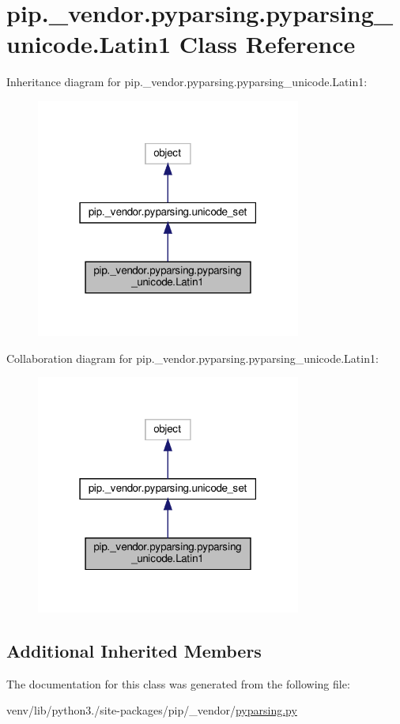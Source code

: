 \hypertarget{classpip_1_1__vendor_1_1pyparsing_1_1pyparsing__unicode_1_1Latin1}{}\section{pip.\+\_\+vendor.\+pyparsing.\+pyparsing\+\_\+unicode.\+Latin1 Class Reference}
\label{classpip_1_1__vendor_1_1pyparsing_1_1pyparsing__unicode_1_1Latin1}


Inheritance diagram for pip.\+\_\+vendor.\+pyparsing.\+pyparsing\+\_\+unicode.\+Latin1\+:
\nopagebreak
\begin{figure}[H]
\begin{center}
\leavevmode
\includegraphics[width=247pt]{classpip_1_1__vendor_1_1pyparsing_1_1pyparsing__unicode_1_1Latin1__inherit__graph}
\end{center}
\end{figure}


Collaboration diagram for pip.\+\_\+vendor.\+pyparsing.\+pyparsing\+\_\+unicode.\+Latin1\+:
\nopagebreak
\begin{figure}[H]
\begin{center}
\leavevmode
\includegraphics[width=247pt]{classpip_1_1__vendor_1_1pyparsing_1_1pyparsing__unicode_1_1Latin1__coll__graph}
\end{center}
\end{figure}
\subsection*{Additional Inherited Members}


The documentation for this class was generated from the following file\+:\begin{DoxyCompactItemize}
\item 
venv/lib/python3./site-\/packages/pip/\+\_\+vendor/\hyperlink{pip_2__vendor_2pyparsing_8py}{pyparsing.\+py}\end{DoxyCompactItemize}
